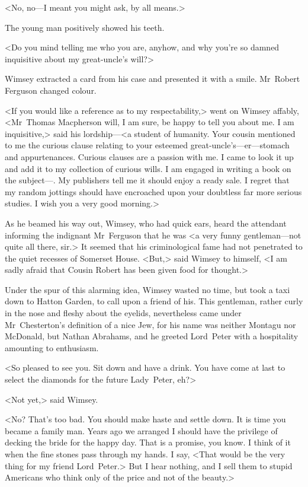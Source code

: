 <No, no—I meant you might ask, by all means.>

The young man positively showed his teeth.

<Do you mind telling me who you are, anyhow, and why you're so damned inquisitive about my great-uncle's will?>

Wimsey extracted a card from his case and presented it with a smile. Mr~Robert Ferguson changed colour.

<If you would like a reference as to my respectability,> went on Wimsey affably, <Mr~Thomas Macpherson will, I am sure, be happy to tell you about me. I am inquisitive,> said his lordship—<a student of humanity. Your cousin mentioned to me the curious clause relating to your esteemed great-uncle's—er—stomach and appurtenances. Curious clauses are a passion with me. I came to look it up and add it to my collection of curious wills. I am engaged in writing a book on the subject—. My publishers tell me it should enjoy a ready sale. I regret that my random jottings should have encroached upon your doubtless far more serious studies. I wish you a very good morning.>

As he beamed his way out, Wimsey, who had quick ears, heard the attendant informing the indignant Mr~Ferguson that he was <a very funny gentleman—not quite all there, sir.> It seemed that his criminological fame had not penetrated to the quiet recesses of Somerset House. <But,> said Wimsey to himself, <I am sadly afraid that Cousin Robert has been given food for thought.>

Under the spur of this alarming idea, Wimsey wasted no time, but took a taxi down to Hatton Garden, to call upon a friend of his. This gentleman, rather curly in the nose and fleshy about the eyelids, nevertheless came under Mr~Chesterton's definition of a nice Jew, for his name was neither Montagu nor McDonald, but Nathan Abrahams, and he greeted Lord~Peter with a hospitality amounting to enthusiasm.

<So pleased to see you. Sit down and have a drink. You have come at last to select the diamonds for the future Lady~Peter, eh?>

<Not yet,> said Wimsey.

<No? That's too bad. You should make haste and settle down. It is time you became a family man. Years ago we arranged I should have the privilege of decking the bride for the happy day. That is a promise, you know. I think of it when the fine stones pass through my hands. I say, <That would be the very thing for my friend Lord~Peter.> But I hear nothing, and I sell them to stupid Americans who think only of the price and not of the beauty.>

